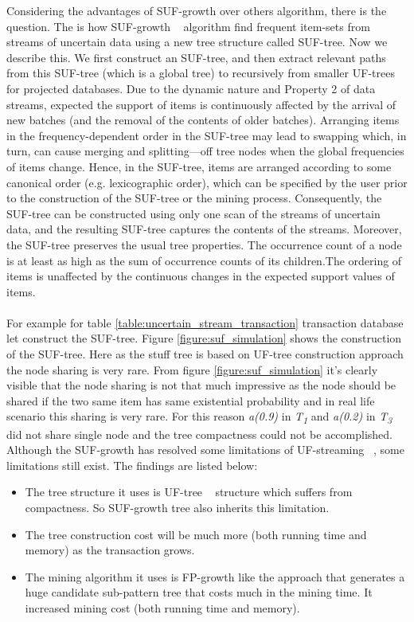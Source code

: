     Considering the advantages of SUF-growth over others algorithm, there is the question. The is how SUF-growth ~\cite{suf_growth} algorithm find frequent item-sets from streams of uncertain data using a new tree structure called SUF-tree. Now we describe this. We ﬁrst construct an SUF-tree, and then extract relevant paths from this SUF-tree (which is a global tree) to recursively from smaller UF-trees for projected databases. Due to the dynamic nature and Property 2 of data streams, expected the support of items is continuously affected by the arrival of new batches (and the removal of the contents of older batches). Arranging items in the frequency-dependent order in the SUF-tree may lead to swapping which, in turn, can cause merging and splitting—off tree nodes when the global frequencies of items change. Hence, in the SUF-tree, items are arranged according to some canonical order (e.g. lexicographic order), which can be speciﬁed by the user prior to the construction of the SUF-tree or the mining process. Consequently, the SUF-tree can be constructed using only one scan of the streams of uncertain data, and the resulting SUF-tree captures the contents of the streams. Moreover, the SUF-tree preserves the usual tree properties. The occurrence count of a node is at least as high as the sum of occurrence counts of its children.The ordering of items is unaffected by the continuous changes in the expected support values of items.\\ \\
    For example for table \ref{table:uncertain_stream_transaction} transaction database let construct the SUF-tree. Figure \ref{figure:suf_simulation} shows the construction of the SUF-tree. Here as the stuff tree is based on UF-tree construction approach the node sharing is very rare. From figure \ref{figure:suf_simulation} it’s clearly visible that the node sharing is not that much impressive as the node should be shared if the two same item has same existential probability and in real life scenario this sharing is very rare. For this reason \emph{a(0.9)} in \emph{T\textsubscript{1}} and \emph{a(0.2)} in \emph{T\textsubscript{3}} did not share single node and the tree compactness could not be accomplished.
    Although the SUF-growth has resolved some limitations of UF-streaming ~\cite{suf_growth}, some limitations still exist. The findings are listed below:
    \begin{itemize}
        \item The tree structure it uses is UF-tree ~\cite{uf_growth} structure which suffers from compactness. So SUF-growth tree also inherits this limitation.
        \item The tree construction cost will be much more (both running time and memory) as the transaction grows.
        \item The mining algorithm it uses is FP-growth like the approach that generates a huge candidate sub-pattern tree that costs much in the mining time. It increased mining cost (both running time and memory).
     \end{itemize}
    
